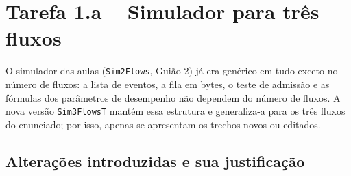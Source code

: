 \documentclass[11pt,a4paper]{article}
\begin{document}
\clearpage
\tableofcontents
\clearpage


\section{Tarefa 1.a -- Simulador para três fluxos}

O simulador das aulas (\texttt{Sim2Flows}, Guião 2) já era genérico em tudo
exceto no número de fluxos: a lista de eventos, a fila em bytes, o teste de
admissão e as fórmulas dos parâmetros de desempenho não dependem do número de
fluxos. A nova versão \texttt{Sim3FlowsT} mantém essa estrutura e generaliza-a
para os três fluxos do enunciado; por isso, apenas se apresentam os trechos
novos ou editados.



\subsection*{Alterações introduzidas e sua justificação}
\end{document}
